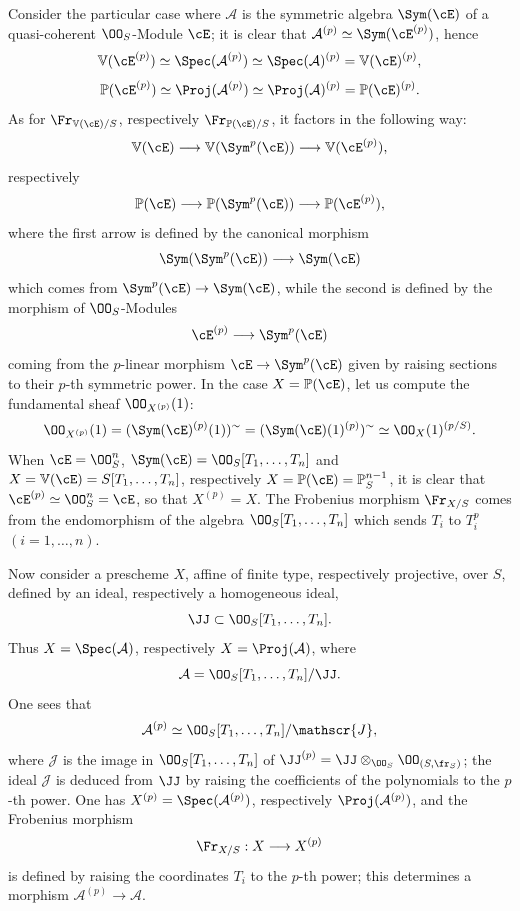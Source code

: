 Consider the particular case where $\mathcal{A}$ is the symmetric algebra $\Sym(\cE)$ of a quasi-coherent $\OO_S$-Module $\cE$; it is clear that $\mathcal{A}^{(p)}\simeq\Sym(\cE^{(p)})$, hence
\[
\mathbb V(\cE^{(p)})\simeq\Spec(\mathcal{A}^{(p)})\simeq\Spec(\mathcal{A})^{(p)}=\mathbb V(\cE)^{(p)},
\]
\[
\mathbb P(\cE^{(p)})\simeq\Proj(\mathcal{A}^{(p)})\simeq\Proj(\mathcal{A})^{(p)}=\mathbb P(\cE)^{(p)}.
\]
As for $\Fr_{\mathbb V(\cE)/S}$, respectively $\Fr_{\mathbb P(\cE)/S}$, it factors in the following way:
\[
\mathbb V(\cE)\longrightarrow \mathbb V(\Sym^p(\cE))\longrightarrow \mathbb V(\cE^{(p)}),
\]
respectively
\[
\mathbb P(\cE)\longrightarrow \mathbb P(\Sym^p(\cE))\longrightarrow \mathbb P(\cE^{(p)}),
\]
where the first arrow is defined by the canonical morphism
\[
\Sym(\Sym^p(\cE))\longrightarrow \Sym(\cE)
\]
which comes from $\Sym^p(\cE)\to\Sym(\cE)$, while the second is defined by the morphism of $\OO_S$-Modules
\[
\cE^{(p)}\longrightarrow \Sym^p(\cE)
\]
coming from the $p$-linear morphism $\cE\to\Sym^p(\cE)$ given by raising sections to their $p$-th symmetric power. In the case $X=\mathbb P(\cE)$, let us compute the fundamental sheaf $\OO_{X^{(p)}}(1)$:
\[
\OO_{X^{(p)}}(1)=(\Sym(\cE)^{(p)}(1))^{\sim}
=(\Sym(\cE)(1)^{(p)})^{\sim}
\simeq \OO_X(1)^{(p/S)}.
\]
When $\cE=\OO_S^n$, $\Sym(\cE)=\OO_S[T_1,\ldots,T_n]$ and $X=\mathbb V(\cE)=S[T_1,\ldots,T_n]$, respectively $X=\mathbb P(\cE)=\mathbb P_S^{n-1}$, it is clear that $\cE^{(p)}\simeq\OO_S^n=\cE$, so that $X^{(p)}=X$. The Frobenius morphism $\Fr_{X/S}$ comes from the endomorphism of the algebra $\OO_S[T_1,\ldots,T_n]$ which sends $T_i$ to $T_i^p$ $(i=1,\ldots,n)$.

Now consider a prescheme $X$, affine of finite type, respectively projective, over $S$, defined by an ideal, respectively a homogeneous ideal,
\[
\JJ\subset \OO_S[T_1,\ldots,T_n].
\]
Thus $X=\Spec(\mathcal{A})$, respectively $X=\Proj(\mathcal{A})$, where
\[
\mathcal{A}=\OO_S[T_1,\ldots,T_n]/\JJ.
\]
One sees that
\[
\mathcal{A}^{(p)}
\simeq \OO_S[T_1,\ldots,T_n]/\mathscr{J},
\]
where $\mathscr{J}$ is the image in $\OO_S[T_1,\ldots,T_n]$ of
$\JJ^{(p)}=\JJ\otimes_{\OO_S}\OO_{(S,\fr_S)}$; the ideal $\mathscr{J}$ is
deduced from $\JJ$ by raising the coefficients of the polynomials to
the $p$-th power. One has $X^{(p)}=\Spec(\mathcal{A}^{(p)})$, respectively $\Proj(\mathcal{A}^{(p)})$, and the Frobenius morphism
\[
\Fr_{X/S}:X\longrightarrow X^{(p)}
\]
is defined by raising the coordinates $T_i$ to the $p$-th power; this determines a morphism $\mathcal{A}^{(p)}\to\mathcal{A}$.


